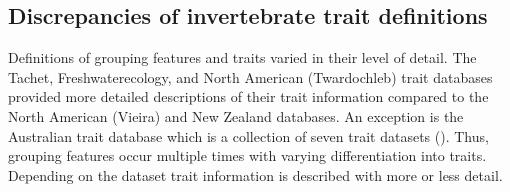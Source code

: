 \documentclass[../Draft_harmonization_paper.tex]{subfiles}
\begin{document}

\subsection*{Discrepancies of invertebrate trait definitions}

Definitions of grouping features and traits varied in their level of detail. The Tachet, Freshwaterecology, and North American (Twardochleb) trait databases provided more detailed descriptions of their trait information compared to the North American (Vieira) and New Zealand databases. An exception is the Australian trait database which is a collection of seven trait datasets (\cite{kefford_integrated_2020}). Thus, grouping features occur multiple times with varying differentiation into traits. Depending on the dataset trait information is described with more or less detail. %
\end{document}
